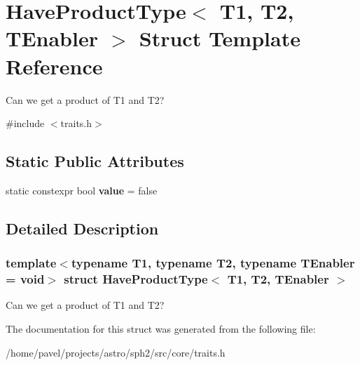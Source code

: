 \hypertarget{structHaveProductType}{}\section{Have\+Product\+Type$<$ T1, T2, T\+Enabler $>$ Struct Template Reference}
\label{structHaveProductType}


Can we get a product of T1 and T2?  




{\ttfamily \#include $<$traits.\+h$>$}

\subsection*{Static Public Attributes}
\begin{DoxyCompactItemize}
\item 
\hypertarget{structHaveProductType_a557f96b6c47751288279f180fbad7238}{}\label{structHaveProductType_a557f96b6c47751288279f180fbad7238} 
static constexpr bool {\bfseries value} = false
\end{DoxyCompactItemize}


\subsection{Detailed Description}
\subsubsection*{template$<$typename T1, typename T2, typename T\+Enabler = void$>$\newline
struct Have\+Product\+Type$<$ T1, T2, T\+Enabler $>$}

Can we get a product of T1 and T2? 

The documentation for this struct was generated from the following file\+:\begin{DoxyCompactItemize}
\item 
/home/pavel/projects/astro/sph2/src/core/traits.\+h\end{DoxyCompactItemize}
